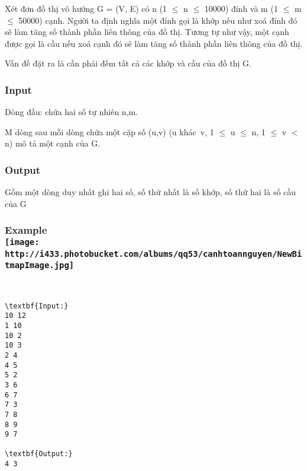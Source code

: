 

Xét đơn đồ thị vô hướng G = (V, E) có n (1  $\le$  n  $\le$  10000) đỉnh và m (1  $\le$  m  $\le$  50000) cạnh. Người ta định nghĩa một đỉnh gọi là khớp nếu như xoá đỉnh đó sẽ làm tăng số thành phần liên thông của đồ thị. Tương tự như vậy, một cạnh được gọi là cầu nếu xoá cạnh đó sẽ làm tăng số thành phần liên thông của đồ thị.

Vấn đề đặt ra là cần phải đếm tất cả các khớp và cầu của đồ thị G.

\subsubsection{Input}

Dòng đầu: chứa hai số tự nhiên n,m.

M dòng sau mỗi dòng chứa một cặp số (u,v) (u khác v, 1  $\le$  u  $\le$  n, 1  $\le$  v $<$ n) mô tả một cạnh của G.

\subsubsection{Output}

Gồm một dòng duy nhất ghi hai số, số thứ nhất là số khớp, số thứ hai là số cầu của G

\subsubsection{Example
\\
\texttt{[image: http://i433.photobucket.com/albums/qq53/canhtoannguyen/NewBitmapImage.jpg]}}

 
\begin{verbatim}
\textbf{Input:}
10 12
1 10
10 2
10 3
2 4
4 5
5 2
3 6
6 7
7 3
7 8
8 9
9 7

\textbf{Output:}
4 3\end{verbatim}

 

 

 

 
